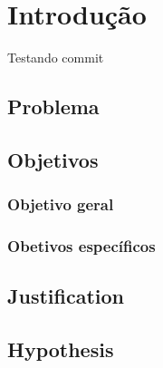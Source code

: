 \chapter{Introdução}\label{ch:intro}
	Testando commit
	\section{Problema}
	
	
	\section{Objetivos}
	
	\subsection{Objetivo geral}
	
	\subsection{Obetivos específicos}
	
%
	
	\section{Justification}

	\section{Hypothesis}
